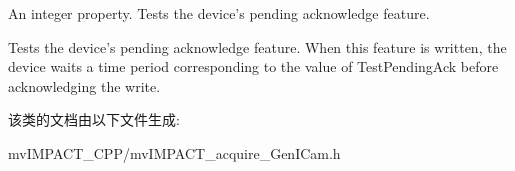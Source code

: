 An integer property. Tests the device's pending acknowledge feature. 

Tests the device's pending acknowledge feature. When this feature is written, the device waits a time period corresponding to the value of Test\+Pending\+Ack before acknowledging the write. 

该类的文档由以下文件生成\+:\begin{DoxyCompactItemize}
\item 
mv\+I\+M\+P\+A\+C\+T\+\_\+\+C\+P\+P/mv\+I\+M\+P\+A\+C\+T\+\_\+acquire\+\_\+\+Gen\+I\+Cam.\+h\end{DoxyCompactItemize}

